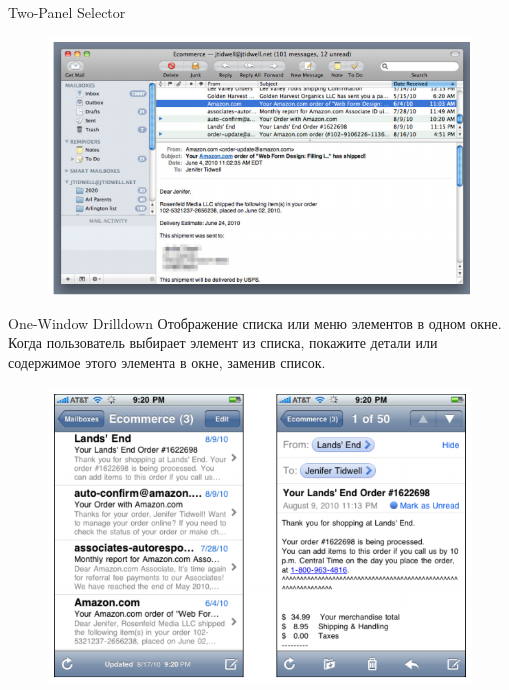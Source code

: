 \documentclass{beamer}
\begin{document}
\begin{frame}[t]{Two-Panel Selector}
	\begin{figure}[h]
		\centering
		\includegraphics[scale=0.6]{images/lec07-pic50.png}
	\end{figure}
\end{frame}	

\begin{frame}[t]{One-Window Drilldown}
	Отображение списка или меню элементов в одном окне. Когда пользователь выбирает элемент из
списка, покажите детали или содержимое этого элемента в окне, заменив список.
	\begin{figure}[h]
		\centering
		\includegraphics[scale=0.5]{images/lec07-pic51.png}
	\end{figure}
\end{frame}	
\end{document}
